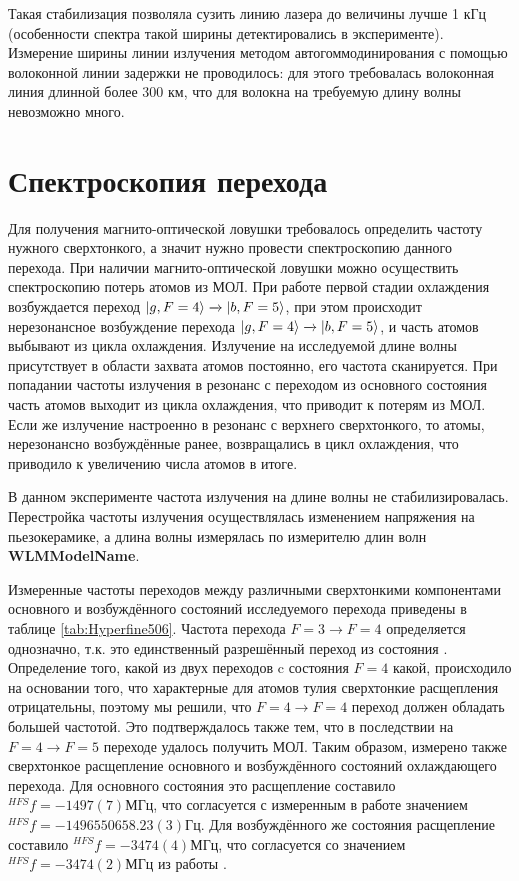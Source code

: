 Такая стабилизация позволяла сузить линию лазера до величины лучше 1 кГц (особенности спектра такой ширины детектировались в эксперименте).
Измерение ширины линии излучения методом автогоммодинирования с помощью волоконной линии задержки не проводилось: для этого требовалась волоконная линия длинной более 300 км, что для волокна на требуемую длину волны невозможно много.

\section{Спектроскопия перехода}

Для получения магнито-оптической ловушки требовалось определить частоту нужного сверхтонкого, а значит нужно провести спектроскопию данного перехода.
При наличии магнито-оптической ловушки можно осуществить спектроскопию потерь атомов из МОЛ. 
При работе первой стадии охлаждения возбуждается переход $\ket{g, F=4}\xrightarrow{} \ket{b, F = 5}$, при этом происходит нерезонансное возбуждение перехода $\ket{g, F=4}\xrightarrow{} \ket{b, F=5}$, и часть атомов выбывают из цикла охлаждения. 
Излучение на исследуемой длине волны присутствует в области захвата атомов постоянно, его частота сканируется. 
При попадании частоты излучения в резонанс с переходом из основного состояния часть атомов выходит из цикла охлаждения, что приводит к потерям из МОЛ.
Если же излучение настроенно в резонанс с верхнего сверхтонкого, то атомы, нерезонансно возбуждённые ранее, возвращались в цикл охлаждения, что приводило к увеличению числа атомов в итоге. 

В данном эксперименте частота излучения на длине волны \thd не стабилизировалась.
Перестройка частоты излучения осуществлялась изменением напряжения на пьезокерамике, а длина волны измерялась по измерителю длин волн \textbf{WLMModelName}. 

Измеренные частоты переходов между различными сверхтонкими компонентами основного и возбуждённого состояний исследуемого перехода приведены в таблице \ref{tab:Hyperfine506}.
Частота перехода $F = 3 \xrightarrow{} F = 4$ определяется однозначно, т.к. это единственный разрешённый переход из состояния . 
Определение того, какой из двух переходов c состояния $F = 4$ какой, происходило на основании того, что характерные для атомов тулия сверхтонкие расщепления отрицательны, поэтому мы решили, что $F = 4 \xrightarrow{} F = 4$ переход должен обладать большей частотой.
Это подтверждалось также тем, что в последствии на $F = 4 \xrightarrow{} F = 5$ переходе удалось получить МОЛ.
Таким образом, измерено также сверхтонкое расщепление основного и возбуждённого состояний охлаждающего перехода. 
Для основного состояния это расщепление составило $^{HFS}f = -1497(7)\unit{МГц}$, что согласуется с измеренным в работе \cite{mishin2024combined} значением $^{HFS}f = - 1 496 550 658.23(3)\unit{Гц}$. 
Для возбуждённого же состояния расщепление составило $^{HFS}f = -3474(4)\unit{МГц}$, что согласуется со значением $^{HFS}f = -3474(2)\unit{МГц}$ из работы \cite{kroger1997high}. 

